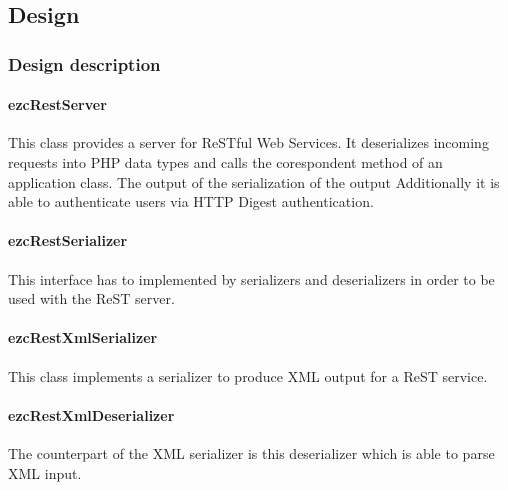 \documentclass[10pt,final,a4paper,oneside]{article}
\begin{document}

\subsection{Design}\label{subsec:ReSTDesign}
%
%

\subsubsection{Design description}
\paragraph{ezcRestServer}
This class provides a server for ReSTful Web Services.
It deserializes incoming requests into PHP data types
and calls the corespondent method of an application class.
The output of the serialization of the output
Additionally it is able to authenticate users
via HTTP Digest authentication.


\paragraph{ezcRestSerializer}
This interface has to implemented by serializers
and deserializers in order to be used with the
ReST server.

\paragraph{ezcRestXmlSerializer}
This class implements a serializer
to produce XML output for a ReST service.

\paragraph{ezcRestXmlDeserializer}
The counterpart of the XML serializer is this
deserializer which is able to parse XML input.
\end{document}
